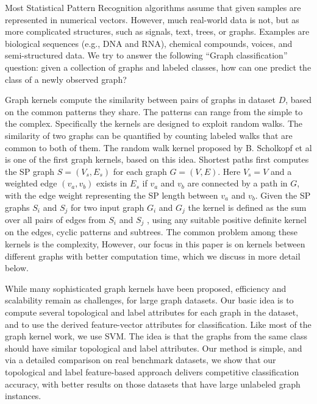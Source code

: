 \documentclass[11pt]{article}
\begin{document}
\begin{flushleft}
{\par{Most Statistical Pattern Recognition algorithms assume that given samples are represented in numerical vectors. However, much real-world data is not, but as more complicated structures, such as signals, text, trees, or graphs. Examples are biological sequences (e.g., DNA and RNA), chemical compounds, voices, and semi-structured data. We try to answer the following  $“$Graph classification$”$ question: given a collection of graphs and labeled classes, how can one predict the class of a newly observed graph?}
\newline 
\par{ Graph kernels compute the similarity between pairs of
graphs in dataset $D$, based on the common patterns they share.
The patterns can range from the simple to the complex.
Specifically the kernels are designed to exploit random
walks. The similarity of two graphs
can be quantified by counting labeled walks
that are common to both of them. The random walk kernel
proposed by B. Scholkopf et al is one of the first graph kernels, based on this idea. Shortest paths first
computes the SP graph $S = (V_{s}, E_{s})$ for each graph $G = (V, E)$. Here $V_{s} = V$ and a weighted edge $(v_{a}, v_{b})$ exists in $E_{s}$ if $v_{a}$ and $v_{b}$ are connected by a path in $G$,
with the edge weight representing the SP length between
$v_{a}$ and $v_{b}$. Given the SP
graphs $S_{i}$ and $S_{j}$ for two input graph $G_{i}$ and $G_{j}$ the kernel is defined as the sum over all pairs of edges from $S_{i}$ and
$S_{j}$ , using any suitable positive definite kernel on the edges, cyclic patterns and subtrees. The common problem among these kernels is the complexity, However, our focus in this paper is on kernels between different graphs with better computation time, which we discuss in more detail below.}
\newline 
\par{While many sophisticated graph kernels have been proposed, efficiency and scalability remain as challenges, for large graph datasets. Our basic idea is to compute several topological and label attributes
for each graph in the dataset, and to use the derived feature-vector attributes for classification. Like most of the graph
kernel work, we use SVM. The idea is that the graphs from the same class should have similar topological and label attributes. Our method is simple, and via a detailed comparison on real
benchmark datasets, we show that our topological and label feature-based approach delivers competitive classification accuracy,
with better results on those datasets that have large unlabeled graph instances.}}
\end{flushleft}
\end{document}
